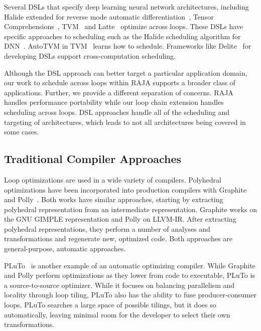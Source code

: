 Several DSLs that specify deep learning neural network
architectures, including Halide extended for reverse mode automatic
differentiation~\cite{Li2018}, Tensor Comprehensions~\cite{Vasilache2018},
TVM~\cite{TVM2018} and Latte~\cite{TruongLatte2016} optimize across loops.
These DSLs have specific approaches to scheduling such as the Halide scheduling
algorithm for DNN~\cite{Yang2020}.
AutoTVM in TVM~\cite{Chen2019} learns how to schedule.
Frameworks like Delite~\cite{Sujeeth2014} for developing DSLs support 
cross-computation scheduling.

Although the DSL approach can better target a particular application domain,
our work to schedule across loops within RAJA supports a broader class of
applications.
Further, we provide a different separation of concerns. RAJA handles
performance portability while our loop chain extension handles scheduling
across loops.
DSL approaches handle all of the scheduling and targeting of architectures,
which leads to not all architectures being covered in some cases.


\subsection{Traditional Compiler Approaches}

Loop optimizations are used in a wide variety of compilers.
Polyhedral optimizations have been incorporated into production compilers with Graphite~\cite{trifunovic2010graphite} and Polly~\cite{grosser2011polly}.
Both works have similar approaches, starting by extracting polyhedral representation from an intermediate representation. 
Graphite works on the GNU GIMPLE representation and Polly on LLVM-IR.
After extracting polyhedral representations, they perform a number of analyses and transformations and regenerate new, optimized code.
Both approaches are general-purpose, automatic approaches.

PLuTo~\cite{bondhugula2008pluto} is another example of an automatic optimizing compiler. 
While Graphite and Polly perform optimizations as they lower from code to executable, PLuTo is a source-to-source optimizer. 
While it focuses on balancing parallelism and locality through loop tiling, PLuTo also has the ability to fuse producer-consumer loops. 
PLuTo searches a large space of possible tilings, but it does so automatically, leaving minimal room for the developer to select their own transformations.

